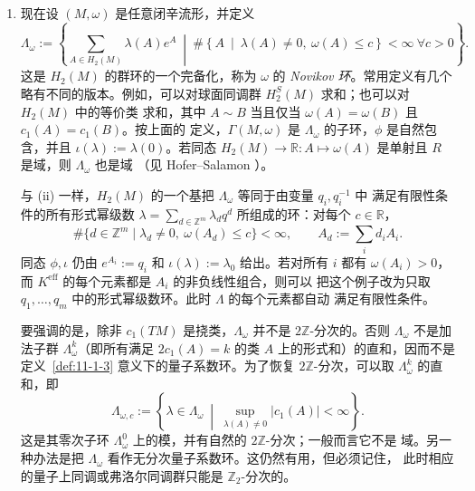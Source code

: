 \begin{example}
\begin{enumerate}[label=\textnormal{(\roman*)}]
\item 现在设 $(M,\omega)$ 是任意闭辛流形，并定义
\begin{equation}\label{eq:11-1-3}
  \Lambda_\omega:=
  \left\{\sum_{A\in H_2(M)}\lambda(A)e^A\ \middle|\
  \#\left\{A\ \middle|\ \lambda(A)\ne0,\ \omega(A)\le c\right\}<\infty
  \ \forall c>0\right\}.
\end{equation}
这是 $H_2(M)$ 的群环的一个完备化，称为 $\omega$ 的 \emph{Novikov 环}。常用定义有几个
略有不同的版本。例如，可以对球面同调群 $H_2^S(M)$ 求和；也可以对 $H_2(M)$ 中的等价类
求和，其中 $A\sim B$ 当且仅当 $\omega(A)=\omega(B)$ 且 $c_1(A)=c_1(B)$。按上面的
定义，$\Gamma(M,\omega)$ 是 $\Lambda_\omega$ 的子环，$\phi$ 是自然包含，并且
$\iota(\lambda):=\lambda(0)$。若同态
$H_2(M)\to\mathbb R:A\mapsto\omega(A)$ 是单射且 $R$ 是域，则 $\Lambda_\omega$ 也是域
（见 Hofer--Salamon \srcite{180}）。

与 (ii) 一样，$H_2(M)$ 的一个基把 $\Lambda_\omega$ 等同于由变量 $q_i,q_i^{-1}$ 中
满足有限性条件的所有形式幂级数
$\lambda=\sum_{d\in\mathbb Z^m}\lambda_dq^d$ 所组成的环：对每个 $c\in\mathbb R$，
\[
  \#\{d\in\mathbb Z^m\mid \lambda_d\ne0,\ \omega(A_d)\le c\}<\infty,
  \qquad A_d:=\sum_i d_iA_i.
\]
同态 $\phi,\iota$ 仍由 $e^{A_i}:=q_i$ 和 $\iota(\lambda):=\lambda_0$ 给出。若对所有 $i$
都有 $\omega(A_i)>0$，而 $K^{\mathrm{eff}}$ 的每个元素都是 $A_i$ 的非负线性组合，则可以
把这个例子改为只取 $q_1,\ldots,q_m$ 中的形式幂级数环。此时 $\Lambda$ 的每个元素都自动
满足有限性条件。

要强调的是，除非 $c_1(TM)$ 是挠类，$\Lambda_\omega$ 并不是 $2\mathbb Z$-分次的。否则
$\Lambda_\omega$ 不是加法子群 $\Lambda_\omega^k$（即所有满足 $2c_1(A)=k$ 的类 $A$
上的形式和）的直和，因而不是定义~\ref{def:11-1-3} 意义下的\BookRecordIndex{T0231}量子系数环。为了恢复
$2\mathbb Z$-分次，可以取 $\Lambda_\omega^k$ 的直和，即
\begin{equation}\label{eq:11-1-4}
  \Lambda_{\omega,c}:=
  \left\{\lambda\in\Lambda_\omega\ \middle|\
  \sup_{\lambda(A)\ne0}|c_1(A)|<\infty\right\}.
\end{equation}
这是其零次子环 $\Lambda_\omega^0$ 上的模，并有自然的 $2\mathbb Z$-分次；一般而言它不是
域。另一种办法是把 $\Lambda_\omega$ 看作无分次量子系数环。这仍然有用，但必须记住，
此时相应的\BookRecordIndex{T0229}量子上同调或\BookRecordIndex{T0132}弗洛尔同调群只能是 $\mathbb Z_2$-分次的。


\end{enumerate}
\end{example}
